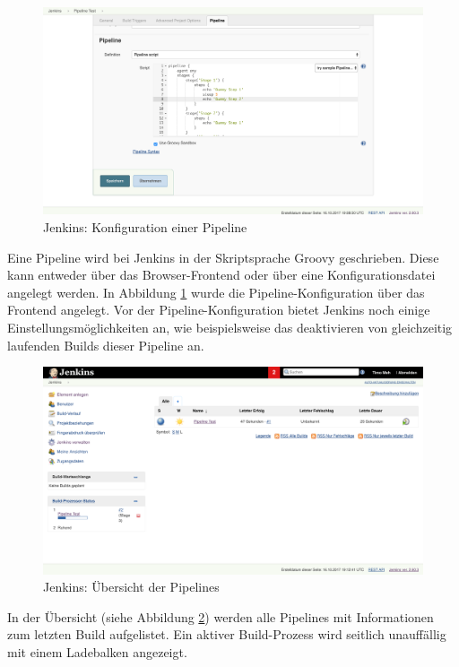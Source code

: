\begin{figure}[h]
  \caption{Jenkins: Konfiguration einer Pipeline}
  \label{fig:jenkins-pipeline-config}
  \includegraphics[width=.8\textwidth]{assets/jenkins-pipeline-script}
\end{figure}

Eine Pipeline wird bei Jenkins in der Skriptsprache Groovy geschrieben. Diese kann entweder über das Browser-Frontend oder über eine Konfigurationsdatei angelegt werden. In Abbildung \ref{fig:jenkins-pipeline-config} wurde die Pipeline-Konfiguration über das Frontend angelegt. Vor der Pipeline-Konfiguration bietet Jenkins noch einige Einstellungsmöglichkeiten an, wie beispielsweise das deaktivieren von gleichzeitig laufenden Builds dieser Pipeline an.

\begin{figure}[h]
  \caption{Jenkins: Übersicht der Pipelines}
  \label{fig:jenkins-pipeline-overview}
  \includegraphics[width=.8\textwidth]{assets/jenkins-pipeline-overview}
\end{figure}

In der Übersicht (siehe Abbildung \ref{fig:jenkins-pipeline-overview}) werden alle Pipelines mit Informationen zum letzten Build aufgelistet. Ein aktiver Build-Prozess wird seitlich unauffällig mit einem Ladebalken angezeigt.

